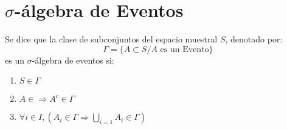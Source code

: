 \section{$\sigma$-álgebra de Eventos}
Se dice que la clase de subconjuntos del espacio muestral $S$, denotado por:
$$\Gamma = \{ A \subset S / A \textrm{ es un Evento}\}$$
es un $\sigma$-álgebra de eventos si:
\begin{enumerate}[label=(\roman*)]
\item $S\in\Gamma$
\item $A\in\Rightarrow A^c \in \Gamma$
\item $\forall i\in I, \left( A_i\in \Gamma \Rightarrow \bigcup\limits_{i=1} A_i \in \Gamma \right) $
\end{enumerate}